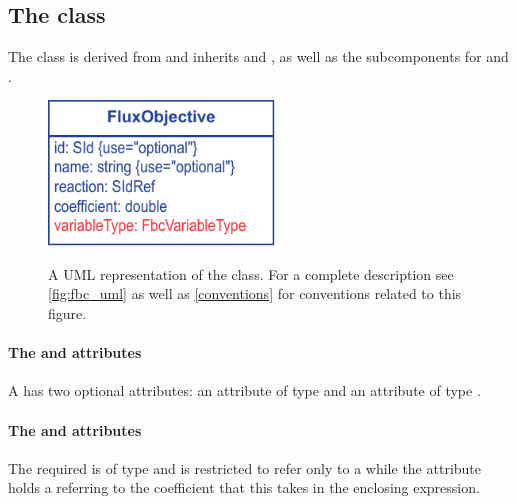 \subsection{The \FBC {} class}
\label{fluxobjective-class}

The \FBC \FluxObjective class is derived from \SBML \SBase and inherits  and , as well as the subcomponents for \Annotation and \Notes.
%
%
\begin{figure}[ht]
  \centering
  \includegraphics[width=6cm]{images/fbc_v3_uml_fobj.pdf}\\
  \caption{A UML representation of the \FBCPackage \FluxObjective class. For a complete description see \ref{fig:fbc_uml} as well as \ref{conventions} for conventions related to this figure.}
  \label{fig:fbc_uml_userdefinedconstraint}
\end{figure}
%
%
\paragraph{The  and  attributes}
A \FluxObjective has two optional attributes:  an attribute of
type  and  an attribute of type .

\paragraph{The  and  attributes}
The required  is of type  and is restricted
to refer only to a \Reaction while the  attribute
holds a  referring to the coefficient that this \FluxObjective
takes in the enclosing \Objective expression.


